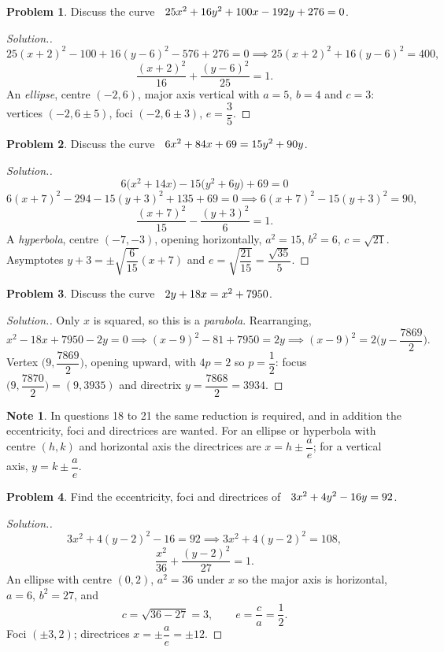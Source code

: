 \documentclass[11pt,a4paper]{article}
\theoremstyle{definition}
\newtheorem*{note}{Note}
\newtheorem{problemx}{Problem}[subsection]
\newenvironment{problem}{\begin{problemx}}{\end{problemx}}
\newenvironment{solution}
  {\renewcommand{\qedsymbol}{}\begin{proof}[\textit{Solution}.]}
  {\end{proof}}
\begin{document}
\begin{problem}
Discuss the curve $\hspace{0.2cm} 25x^2 + 16y^2 + 100x - 192y + 276 = 0$.
\end{problem}
\begin{solution}
$$25(x+2)^2 - 100 + 16(y-6)^2 - 576 + 276 = 0
\implies 25(x+2)^2 + 16(y-6)^2 = 400 ,$$
$$\frac{(x+2)^2}{16} + \frac{(y-6)^2}{25} = 1 .$$
An \emph{ellipse}, centre $(-2,6)$, major axis vertical with $a = 5$, $b = 4$
and $c = 3$: vertices $(-2, 6\pm 5)$, foci $(-2, 6\pm 3)$, $e = \dfrac{3}{5}$.
\end{solution}

\begin{problem}
Discuss the curve $\hspace{0.2cm} 6x^2 + 84x + 69 = 15y^2 + 90y$.
\end{problem}
\begin{solution}
$$6\big(x^2+14x\big) - 15\big(y^2+6y\big) + 69 = 0$$
$$6(x+7)^2 - 294 - 15(y+3)^2 + 135 + 69 = 0
\implies 6(x+7)^2 - 15(y+3)^2 = 90 ,$$
$$\frac{(x+7)^2}{15} - \frac{(y+3)^2}{6} = 1 .$$
A \emph{hyperbola}, centre $(-7,-3)$, opening horizontally, $a^2 = 15$,
$b^2 = 6$, $c = \sqrt{21}$. Asymptotes
$y + 3 = \pm\sqrt{\dfrac{6}{15}}(x+7)$ and
$e = \sqrt{\dfrac{21}{15}} = \dfrac{\sqrt{35}}{5}$.
\end{solution}

\begin{problem}
Discuss the curve $\hspace{0.2cm} 2y + 18x = x^2 + 7950$.
\end{problem}
\begin{solution}
Only $x$ is squared, so this is a \emph{parabola}. Rearranging,
$$x^2 - 18x + 7950 - 2y = 0 \implies (x-9)^2 - 81 + 7950 = 2y
\implies (x-9)^2 = 2\Big(y - \frac{7869}{2}\Big).$$
Vertex $\Big(9, \dfrac{7869}{2}\Big)$, opening upward, with $4p = 2$ so
$p = \dfrac{1}{2}$: focus $\Big(9, \dfrac{7870}{2}\Big) = (9, 3935)$ and
directrix $y = \dfrac{7868}{2} = 3934$.
\end{solution}

\begin{note}
In questions 18 to 21 the same reduction is required, and in addition the
eccentricity, foci and directrices are wanted. For an ellipse or hyperbola with
centre $(h,k)$ and horizontal axis the directrices are
$x = h \pm \dfrac{a}{e}$; for a vertical axis, $y = k \pm \dfrac{a}{e}$.
\end{note}

\begin{problem}
Find the eccentricity, foci and directrices of
$\hspace{0.2cm} 3x^2 + 4y^2 - 16y = 92$.
\end{problem}
\begin{solution}
$$3x^2 + 4(y-2)^2 - 16 = 92 \implies 3x^2 + 4(y-2)^2 = 108 ,$$
$$\frac{x^2}{36} + \frac{(y-2)^2}{27} = 1 .$$
An ellipse with centre $(0,2)$, $a^2 = 36$ under $x$ so the major axis is
horizontal, $a = 6$, $b^2 = 27$, and
$$c = \sqrt{36-27} = 3, \qquad e = \frac{c}{a} = \frac{1}{2}.$$
Foci $(\pm 3, 2)$; directrices $x = \pm\dfrac{a}{e} = \pm 12$.
\end{solution}
\end{document}
